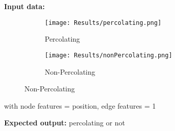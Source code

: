 \vspace*{-0.5cm}
\textbf{Input data:}
\begin{figure}[h]
    \centering
    \begin{subfigure}[t]{0.45\textwidth}
        \centering
        \texttt{[image: Results/percolating.png]}
        \caption{Percolating}
    \end{subfigure}
    \hfill
    \begin{subfigure}[t]{0.45\textwidth}
        \centering
        \texttt{[image: Results/nonPercolating.png]}
        \caption{Non-Percolating}
    \end{subfigure}
\end{figure}
with node features = position, edge features = 1\par
\textbf{Expected output:} percolating or not
